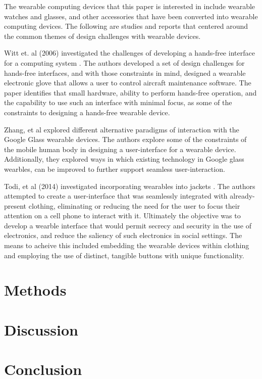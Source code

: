 \documentclass[12pt]{article}
\begin{document}
The wearable computing devices that this paper is interested in include wearable watches and glasses, and other accessories that have been converted into wearable computing devices. The following are studies and reports that centered around the common themes of design challenges with wearable devices.

Witt et. al (2006) investigated the challenges of developing a hands-free interface for a computing system \cite{witt}. The authors developed a set of design challenges for hands-free interfaces, and with those constraints in mind, designed a wearable electronic glove that allows a user to control aircraft maintenance software. The paper identifies that small hardware, ability to perform hands-free operation, and the capability to use such an interface with minimal focus, as some of the constraints to designing a hands-free wearable device.

Zhang, et al explored different alternative paradigms of interaction with the Google Glass wearable devices. The authors explore some of the constraints of the mobile human body in designing a user-interface for a wearable device. Additionally, they explored ways in which existing technology in Google glass wearbles, can be improved to further support seamless user-interaction. 

Todi, et al (2014) investigated incorporating wearables into jackets \cite{todi}. The authors attempted to create a user-interface that was seamlessly integrated with already-present clothing, eliminating or reducing the need for the user to focus their attention on a cell phone to interact with it. Ultimately the objective was to develop a wearble interface that would permit secrecy and security in the use of electronics, and reduce the saliency of such electronics in social settings.  The means to acheive this included embedding the wearable devices within clothing and employing the use of distinct, tangible buttons with unique functionality.


\section{Methods}

\section{Discussion}

\section{Conclusion}




\end{document}
